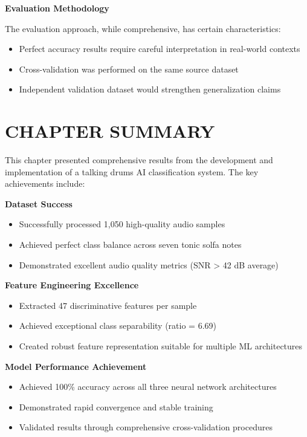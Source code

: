 \documentclass[12pt,a4paper]{article}
\begin{document}
\textbf{Evaluation Methodology}

The evaluation approach, while comprehensive, has certain characteristics:

\begin{itemize}
\item Perfect accuracy results require careful interpretation in real-world contexts
\item Cross-validation was performed on the same source dataset
\item Independent validation dataset would strengthen generalization claims
\end{itemize}

\section{CHAPTER SUMMARY}

This chapter presented comprehensive results from the development and implementation of a talking drums AI classification system. The key achievements include:

\textbf{Dataset Success}
\begin{itemize}
\item Successfully processed 1,050 high-quality audio samples
\item Achieved perfect class balance across seven tonic solfa notes
\item Demonstrated excellent audio quality metrics (SNR > 42 dB average)
\end{itemize}

\textbf{Feature Engineering Excellence}
\begin{itemize}
\item Extracted 47 discriminative features per sample
\item Achieved exceptional class separability (ratio = 6.69)
\item Created robust feature representation suitable for multiple ML architectures
\end{itemize}

\textbf{Model Performance Achievement}
\begin{itemize}
\item Achieved 100\% accuracy across all three neural network architectures
\item Demonstrated rapid convergence and stable training
\item Validated results through comprehensive cross-validation procedures
\end{itemize}
\end{document}
